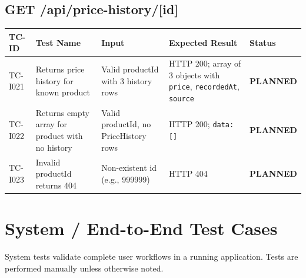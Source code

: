 \documentclass[12pt,a4paper]{report}
\newcommand{\PEND}{\textcolor{pendyellow}{\textbf{PLANNED}}}
\begin{document}
\section{GET /api/price-history/[id]}

\begin{longtable}{C{1.6cm} L{4cm} L{4cm} L{3.5cm} C{1.5cm}}
  \toprule
  \textbf{TC-ID} & \textbf{Test Name} & \textbf{Input} & \textbf{Expected Result} & \textbf{Status} \\
  \midrule
  \endhead
  \bottomrule
  \endlastfoot

  TC-I021 &
    Returns price history for known product &
    Valid productId with 3 history rows &
    HTTP 200; array of 3 objects with \texttt{price}, \texttt{recordedAt}, \texttt{source} &
    \PEND \\

  TC-I022 &
    Returns empty array for product with no history &
    Valid productId, no PriceHistory rows &
    HTTP 200; \texttt{data: []} &
    \PEND \\

  TC-I023 &
    Invalid productId returns 404 &
    Non-existent id (e.g., 999999) &
    HTTP 404 &
    \PEND \\

\end{longtable}

\chapter{System / End-to-End Test Cases}

System tests validate complete user workflows in a running application.
Tests are performed manually unless otherwise noted.
\end{document}
